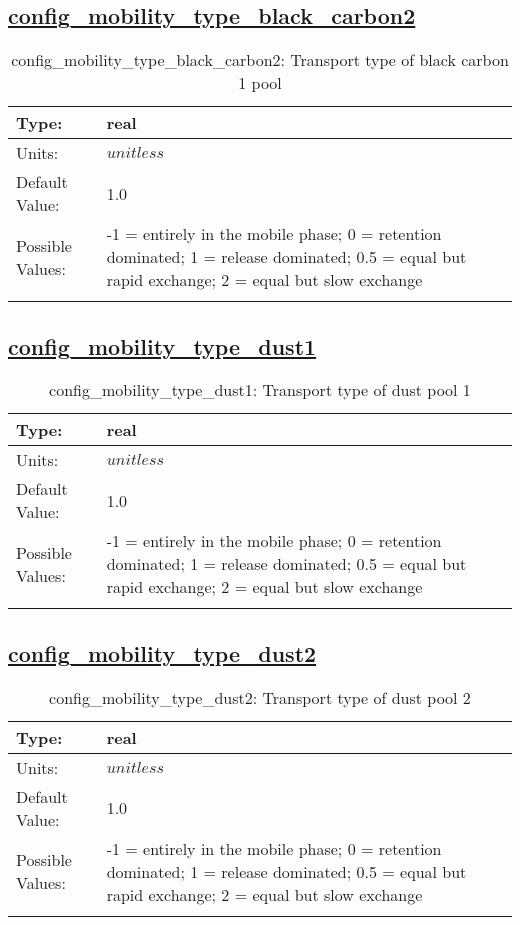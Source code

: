 \subsection[config\_mobility\_type\_black\_carbon2]{\hyperref[sec:nm_tab_biogeochemistry]{config\_mobility\_type\_black\_carbon2}}
\label{subsec:nm_sec_config_mobility_type_black_carbon2}
\begin{center}
\begin{longtable}{| p{2.0in} || p{4.0in} |}
    \hline
    Type: & real \\
    \hline
    Units: & $unitless$ \\
    \hline
    Default Value: & 1.0 \\
    \hline
    Possible Values: & -1 = entirely in the mobile phase; 0 = retention dominated;     1 = release dominated; 0.5 = equal but rapid exchange;     2 = equal but slow exchange \\
    \hline
    \caption{config\_mobility\_type\_black\_carbon2: Transport type of black carbon 1 pool}
\end{longtable}
\end{center}
\subsection[config\_mobility\_type\_dust1]{\hyperref[sec:nm_tab_biogeochemistry]{config\_mobility\_type\_dust1}}
\label{subsec:nm_sec_config_mobility_type_dust1}
\begin{center}
\begin{longtable}{| p{2.0in} || p{4.0in} |}
    \hline
    Type: & real \\
    \hline
    Units: & $unitless$ \\
    \hline
    Default Value: & 1.0 \\
    \hline
    Possible Values: & -1 = entirely in the mobile phase; 0 = retention dominated;     1 = release dominated; 0.5 = equal but rapid exchange;     2 = equal but slow exchange \\
    \hline
    \caption{config\_mobility\_type\_dust1: Transport type of dust pool 1}
\end{longtable}
\end{center}
\subsection[config\_mobility\_type\_dust2]{\hyperref[sec:nm_tab_biogeochemistry]{config\_mobility\_type\_dust2}}
\label{subsec:nm_sec_config_mobility_type_dust2}
\begin{center}
\begin{longtable}{| p{2.0in} || p{4.0in} |}
    \hline
    Type: & real \\
    \hline
    Units: & $unitless$ \\
    \hline
    Default Value: & 1.0 \\
    \hline
    Possible Values: & -1 = entirely in the mobile phase; 0 = retention dominated;     1 = release dominated; 0.5 = equal but rapid exchange;     2 = equal but slow exchange \\
    \hline
    \caption{config\_mobility\_type\_dust2: Transport type of dust pool 2}
\end{longtable}
\end{center}
